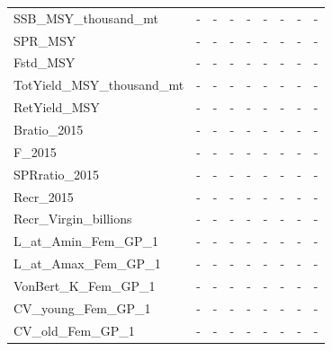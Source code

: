 \documentclass[12pt,]{article}
\begin{document}
\begin{table}
{\begin{tabular}{l>{\centering}p{.6in}>{\centering}p{.6in}>{\centering}p{.6in}>{\centering}p{.6in}>{\centering}p{.6in}>{\centering}p{.6in}>{\centering}p{.6in}>{\centering}p{.6in}}
  SSB\_MSY\_thousand\_mt & - & - & - & - & - & - & - & - \\ 
  SPR\_MSY & - & - & - & - & - & - & - & - \\ 
  Fstd\_MSY & - & - & - & - & - & - & - & - \\ 
  TotYield\_MSY\_thousand\_mt & - & - & - & - & - & - & - & - \\ 
  RetYield\_MSY & - & - & - & - & - & - & - & - \\ 
  Bratio\_2015 & - & - & - & - & - & - & - & - \\ 
  F\_2015 & - & - & - & - & - & - & - & - \\ 
  SPRratio\_2015 & - & - & - & - & - & - & - & - \\ 
  Recr\_2015 & - & - & - & - & - & - & - & - \\ 
  Recr\_Virgin\_billions & - & - & - & - & - & - & - & - \\ 
  L\_at\_Amin\_Fem\_GP\_1 & - & - & - & - & - & - & - & - \\ 
  L\_at\_Amax\_Fem\_GP\_1 & - & - & - & - & - & - & - & - \\ 
  VonBert\_K\_Fem\_GP\_1 & - & - & - & - & - & - & - & - \\ 
  CV\_young\_Fem\_GP\_1 & - & - & - & - & - & - & - & - \\ 
  CV\_old\_Fem\_GP\_1 & - & - & - & - & - & - & - & - \\ 
   \hline
\end{tabular}
}
\end{table}

\newpage
\end{document}
